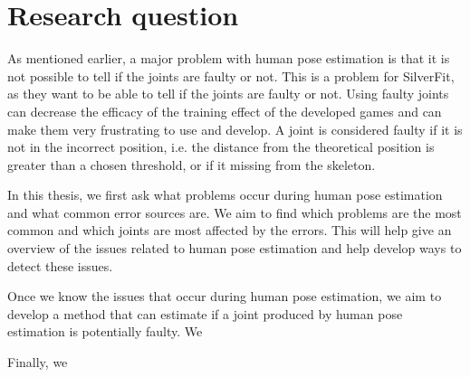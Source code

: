 \section{Research question}

As mentioned earlier, a major problem with human pose estimation is that it is not possible to tell if the joints are faulty or not. This is a problem for SilverFit, as they want to be able to tell if the joints are faulty or not. Using faulty joints can decrease the efficacy of the training effect of the developed games and can make them very frustrating to use and develop. A joint is considered faulty if it is not in the incorrect position, i.e. the distance from the theoretical position is greater than a chosen threshold, or if it missing from the skeleton.

In this thesis, we first ask what problems occur during human pose estimation and what common error sources are. We aim to find which problems are the most common and which joints are most affected by the errors. This will help give an overview of the issues related to human pose estimation and help develop ways to detect these issues. 

Once we know the issues that occur during human pose estimation, we aim to develop a method that can estimate if a joint produced by human pose estimation is potentially faulty. We  

Finally, we 


